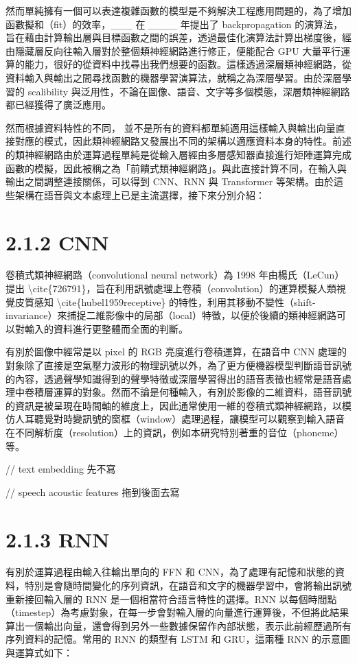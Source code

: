 然而單純擁有一個可以表達複雜函數的模型是不夠解決工程應用問題的，為了增加函數擬和（fit）的效率，\_\_\_ 在 \_\_\_\_ 年提出了 backpropagation 的演算法，旨在藉由計算輸出層與目標函數之間的誤差，透過最佳化演算法計算出梯度後，經由隱藏層反向往輸入層對於整個類神經網路進行修正，便能配合 GPU 大量平行運算的能力，很好的從資料中找尋出我們想要的函數。這樣透過深層類神經網路，從資料輸入與輸出之間尋找函數的機器學習演算法，就稱之為深層學習。由於深層學習的 scalibility 與泛用性，不論在圖像、語音、文字等多個模態，深層類神經網路都已經獲得了廣泛應用。

然而根據資料特性的不同， 並不是所有的資料都單純適用這樣輸入與輸出向量直接對應的模式，因此類神經網路又發展出不同的架構以適應資料本身的特性。前述的類神經網路由於運算過程單純是從輸入層經由多層感知器直接進行矩陣運算完成函數的模擬，因此被稱之為「前饋式類神經網路」。與此直接計算不同，在輸入與輸出之間調整連接關係，可以得到 CNN、RNN 與 Transformer 等架構。由於這些架構在語音與文本處理上已是主流選擇，接下來分別介紹：

\section{2.1.2 CNN}

卷積式類神經網路（convolutional neural network）為 1998 年由楊氏（LeCun）提出 \textbackslash{}cite\{726791\}，旨在利用訊號處理上卷積（convolution）的運算模擬人類視覺皮質感知 \textbackslash{}cite\{hubel1959receptive\} 的特性，利用其移動不變性（shift-invariance）來捕捉二維影像中的局部（local）特徵，以便於後續的類神經網路可以對輸入的資料進行更整體而全面的判斷。

有別於圖像中經常是以 pixel 的 RGB 亮度進行卷積運算，在語音中 CNN 處理的對象除了直接是空氣壓力波形的物理訊號以外，為了更方便機器模型判斷語音訊號的內容，透過聲學知識得到的聲學特徵或深層學習得出的語音表徵也經常是語音處理中卷積層運算的對象。然而不論是何種輸入，有別於影像的二維資料，語音訊號的資訊是被呈現在時間軸的維度上，因此通常使用一維的卷積式類神經網路，以模仿人耳聽覺對時變訊號的窗框（window）處理過程，讓模型可以觀察到輸入語音在不同解析度（resolution）上的資訊，例如本研究特別著重的音位（phoneme）等。

// text embedding 先不寫

// speech acoustic features 拖到後面去寫

\section{2.1.3 RNN}

有別於運算過程由輸入往輸出單向的 FFN 和 CNN，為了處理有記憶和狀態的資料，特別是會隨時間變化的序列資訊，在語音和文字的機器學習中，會將輸出訊號重新接回輸入層的 RNN 是一個相當符合語言特性的選擇。RNN 以每個時間點（timestep）為考慮對象，在每一步會對輸入層的向量進行運算後，不但將此結果算出一個輸出向量，還會得到另外一些數據保留作內部狀態，表示此前經歷過所有序列資料的記憶。常用的 RNN 的類型有 LSTM 和 GRU，這兩種 RNN 的示意圖與運算式如下：

